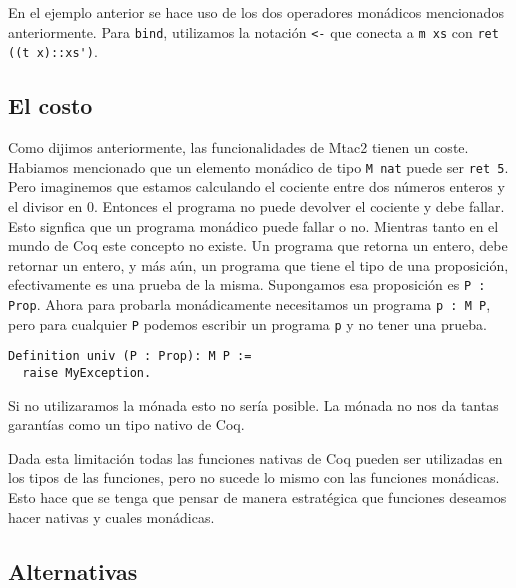 En el ejemplo anterior se hace uso de los dos operadores monádicos mencionados anteriormente. Para \lstinline{bind}, utilizamos la notación \lstinline{<-} que conecta a \lstinline{m xs} con \lstinline{ret ((t x)::xs')}.

\subsection{El costo}

Como dijimos anteriormente, las funcionalidades de Mtac2 tienen un coste. Habiamos mencionado que un elemento monádico de tipo \lstinline{M nat} puede ser \lstinline{ret 5}. Pero imaginemos que estamos calculando el cociente entre dos números enteros y el divisor en 0. Entonces el programa no puede devolver el cociente y debe fallar. Esto signfica que un programa monádico puede fallar o no. Mientras tanto en el mundo de Coq este concepto no existe. Un programa que retorna un entero, debe retornar un entero, y más aún, un programa que tiene el tipo de una proposición, efectivamente es una prueba de la misma. Supongamos esa proposición es \lstinline{P : Prop}. Ahora para probarla monádicamente necesitamos un programa \lstinline{p : M P}, pero para cualquier \lstinline{P} podemos escribir un programa \lstinline{p} y no tener una prueba.
\begin{lstlisting}
Definition univ (P : Prop): M P :=
  raise MyException.
\end{lstlisting}

Si no utilizaramos la mónada esto no sería posible. La mónada no nos da tantas garantías como un tipo nativo de Coq.

Dada esta limitación todas las funciones nativas de Coq pueden ser utilizadas en los tipos de las funciones, pero no sucede lo mismo con las funciones monádicas. Esto hace que se tenga que pensar de manera estratégica que funciones deseamos hacer nativas y cuales monádicas.

\subsection{Alternativas}
